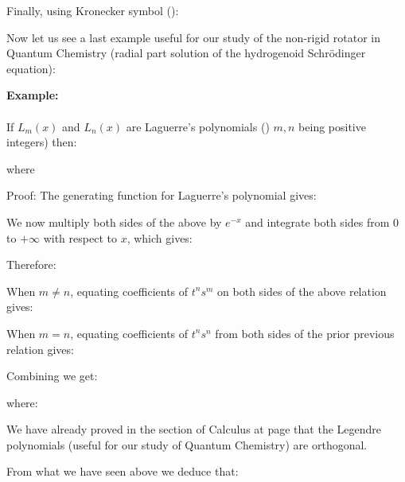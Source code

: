 	\begin{tcolorbox}[colframe=black,colback=white,sharp corners]
	Finally, using Kronecker symbol ():
	
	\end{tcolorbox}
	
	\label{orthogonality of Laguerre polynomial}
	Now let us see a last example useful for our study of the non-rigid rotator in Quantum Chemistry (radial part solution of the hydrogenoid Schrödinger equation):
	\begin{tcolorbox}[colframe=black,colback=white,sharp corners]
	\textbf{{\Large {}}Example:}\\\\
	If $L_{m}(x)$ and $L_{n}(x)$ are Laguerre's polynomials () $m,n$ being positive integers) then:
	
	where
	
	Proof: The generating function for Laguerre's polynomial gives:
	
	We now multiply both sides of the above by $e^{-x}$ and integrate both sides from $0$ to $+\infty$ with respect to $x$, which gives:
	
	Therefore:
	
	\end{tcolorbox}
	
	\begin{tcolorbox}[colframe=black,colback=white,sharp corners]
	
	When $m\neq n$, equating coefficients of $t^{n} s^{m}$ on both sides of the above relation gives:
	
	When $m=n$, equating coefficients of $t^{n} s^{n}$ from both sides of the prior previous relation gives:
	
	Combining we get:
	
	where:
	
	\end{tcolorbox}
	
	\begin{tcolorbox}[title=Remark,colframe=black,arc=10pt]
	We have already proved in the section of Calculus at page \pageref{legendre polynomials} that the Legendre polynomials (useful for our study of Quantum Chemistry) are orthogonal.
	\end{tcolorbox}
	From what we have seen above we deduce that:
	
